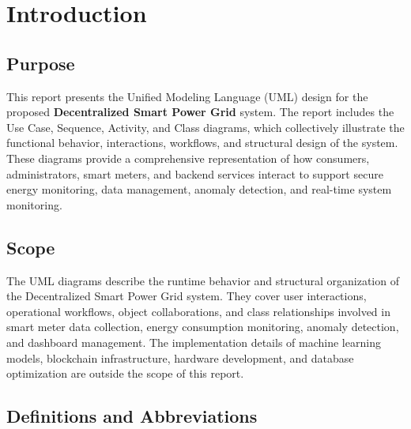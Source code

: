 \section{Introduction}

\subsection{Purpose}

This report presents the Unified Modeling Language (UML) design for the proposed
\textbf{Decentralized Smart Power Grid} system. The report includes the Use Case,
Sequence, Activity, and Class diagrams, which collectively illustrate the
functional behavior, interactions, workflows, and structural design of the
system. These diagrams provide a comprehensive representation of how consumers,
administrators, smart meters, and backend services interact to support secure
energy monitoring, data management, anomaly detection, and real-time system
monitoring.

\subsection{Scope}

The UML diagrams describe the runtime behavior and structural organization of
the Decentralized Smart Power Grid system. They cover user interactions,
operational workflows, object collaborations, and class relationships involved
in smart meter data collection, energy consumption monitoring, anomaly
detection, and dashboard management. The implementation details of machine
learning models, blockchain infrastructure, hardware development, and database
optimization are outside the scope of this report.

\subsection{Definitions and Abbreviations}

